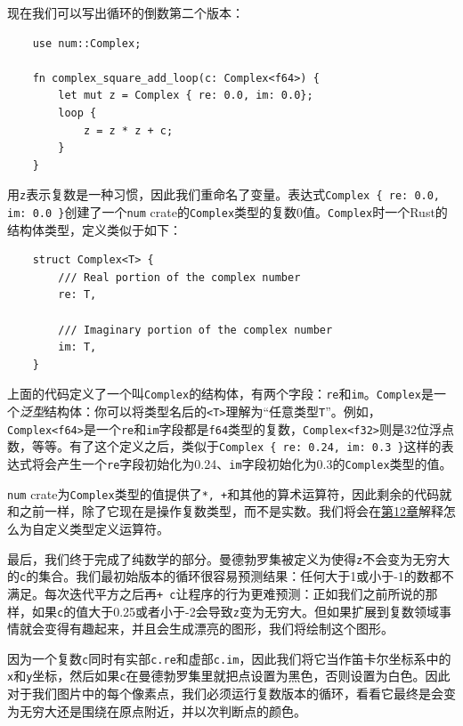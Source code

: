 现在我们可以写出循环的倒数第二个版本：
\begin{verbatim}
    use num::Complex;

    fn complex_square_add_loop(c: Complex<f64>) {
        let mut z = Complex { re: 0.0, im: 0.0};
        loop {
            z = z * z + c;
        }
    }
\end{verbatim}

用\texttt{z}表示复数是一种习惯，因此我们重命名了变量。表达式\texttt{Complex \{ re: 0.0, im: 0.0 \}}创建了一个\texttt{num} crate的\texttt{Complex}类型的复数0值。\texttt{Complex}时一个Rust的结构体类型，定义类似于如下：
\begin{verbatim}
    struct Complex<T> {
        /// Real portion of the complex number
        re: T,

        /// Imaginary portion of the complex number
        im: T,
    }
\end{verbatim}

上面的代码定义了一个叫\texttt{Complex}的结构体，有两个字段：\texttt{re}和\texttt{im}。\texttt{Complex}是一个\emph{泛型}结构体：你可以将类型名后的\texttt{<T>}理解为“任意类型\texttt{T}”。例如，\texttt{Complex<f64>}是一个\texttt{re}和\texttt{im}字段都是\texttt{f64}类型的复数，\texttt{Complex<f32>}则是32位浮点数，等等。有了这个定义之后，类似于\texttt{Complex \{ re: 0.24, im: 0.3 \}}这样的表达式将会产生一个\texttt{re}字段初始化为0.24、\texttt{im}字段初始化为0.3的\texttt{Complex}类型的值。

\texttt{num} crate为\texttt{Complex}类型的值提供了\texttt{*, +}和其他的算术运算符，因此剩余的代码就和之前一样，除了它现在是操作复数类型，而不是实数。我们将会在\hyperref[ch12]{第12章}解释怎么为自定义类型定义运算符。

最后，我们终于完成了纯数学的部分。曼德勃罗集被定义为使得\texttt{z}不会变为无穷大的\texttt{c}的集合。我们最初始版本的循环很容易预测结果：任何大于1或小于-1的数都不满足。每次迭代平方之后再\texttt{+ c}让程序的行为更难预测：正如我们之前所说的那样，如果\texttt{c}的值大于0.25或者小于-2会导致\texttt{z}变为无穷大。但如果扩展到复数领域事情就会变得有趣起来，并且会生成漂亮的图形，我们将绘制这个图形。

因为一个复数\texttt{c}同时有实部\texttt{c.re}和虚部\texttt{c.im}，因此我们将它当作笛卡尔坐标系中的\texttt{x}和\texttt{y}坐标，然后如果\texttt{c}在曼德勃罗集里就把点设置为黑色，否则设置为白色。因此对于我们图片中的每个像素点，我们必须运行复数版本的循环，看看它最终是会变为无穷大还是围绕在原点附近，并以次判断点的颜色。

